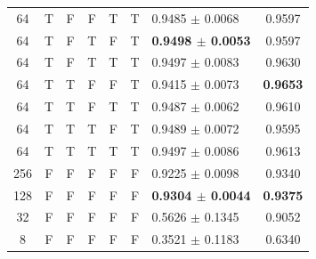 \begin{tabular}{c c c c c c l c}
64 & T & F & F & T & T & 0.9485 $\pm$ 0.0068 & 0.9597 \\
64 & T & F & T & F & T & \textbf{0.9498 $\pm$ 0.0053} & 0.9597 \\
64 & T & F & T & T & T & 0.9497 $\pm$ 0.0083 & 0.9630 \\
64 & T & T & F & F & T & 0.9415 $\pm$ 0.0073 & \textbf{0.9653} \\
64 & T & T & F & T & T & 0.9487 $\pm$ 0.0062 & 0.9610 \\
64 & T & T & T & F & T & 0.9489 $\pm$ 0.0072 & 0.9595 \\
64 & T & T & T & T & T & 0.9497 $\pm$ 0.0086 & 0.9613 \\
\midrule
256 & F & F & F & F & F & 0.9225 $\pm$ 0.0098 & 0.9340 \\
128 & F & F & F & F & F & \textbf{0.9304 $\pm$ 0.0044} & \textbf{0.9375} \\
32 & F & F & F & F & F & 0.5626 $\pm$ 0.1345 & 0.9052 \\
8 & F & F & F & F & F & 0.3521 $\pm$ 0.1183 & 0.6340 \\
\bottomrule
\end{tabular}
